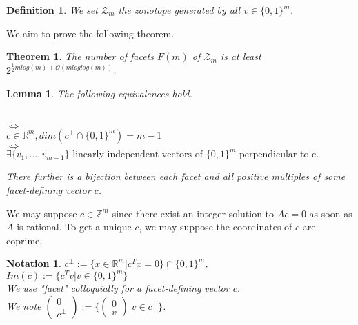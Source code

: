 \documentclass[12pt]{report}
\newtheorem*{lemma}{Lemma}
\newtheorem*{definition}{Definition}
\newtheorem*{notation}{Notation}
\newtheorem*{theorem}{Theorem}
\newcommand{\R}{\mathbb{R}}
\newcommand{\Z}{\mathbb{Z}}
\newcommand{\mZ}{\mathcal{Z}}
\begin{document}
\begin{definition}
We set $\mZ_m$ the zonotope generated by all $v \in \{0, 1\}^m$.
\end{definition}

We aim to prove the following theorem.
\begin{theorem}
The number of facets $F(m)$ of $\mZ_m$ is at least $2^{\frac12 m log(m) + \mathcal{O}(m loglog(m))}$.
\end{theorem}

\begin{lemma}
The following equivalences hold.

\begin{center}
 \\
$\iff$ \\
$c \in \R^m, dim(c^\perp \cap \{0, 1\}^m) = m-1$ \\ 
$\iff$ \\
$\exists \{v_1, \dots, v_{m-1}\} \text{ linearly independent vectors of } \{0, 1\}^m \text{ perpendicular to c.}$
\end{center}

There further is a bijection between each facet and all positive multiples of some facet-defining vector $c$.
\end{lemma}
We may suppose $c \in \Z^m$ since there exist an integer solution to $Ac = 0$ as soon as $A$ is rational. To get a unique $c$, we may suppose the coordinates of $c$ are coprime.

\begin{notation}
$c^\perp := \{ x \in \R^m | c^T x=0 \} \cap \{0, 1\}^m$, \\ $Im(c) := \{ c^T v | v \in \{0, 1\}^m\}$   \\ We use "facet" colloquially for a facet-defining vector $c$. \\ We note $\begin{pmatrix} 0 \\ c^\perp \end{pmatrix} := \{ \begin{pmatrix} 0 \\ v \end{pmatrix} | v \in c^\perp \}$.
\end{notation}
\end{document}

